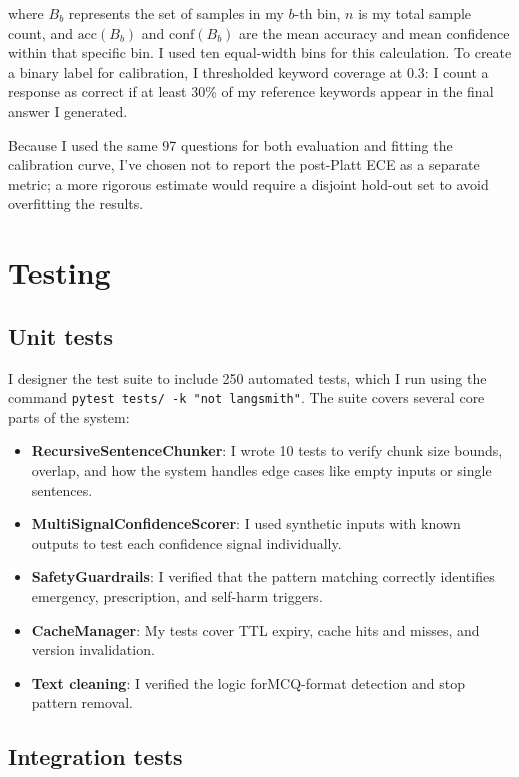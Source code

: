 where $B_b$ represents the set of samples in my $b$-th bin, $n$ is my total sample count, and $\text{acc}(B_b)$ and $\text{conf}(B_b)$ are the mean accuracy and mean confidence within that specific bin. I used ten equal-width bins for this calculation. To create a binary label for calibration, I thresholded keyword coverage at 0.3: I count a response as correct if at least 30\% of my reference keywords appear in the final answer I generated.

Because I used the same 97 questions for both evaluation and fitting the calibration curve, I've chosen not to report the post-Platt ECE as a separate metric; a more rigorous estimate would require a disjoint hold-out set to avoid overfitting the results.

\section{Testing}

\subsection{Unit tests}

I designer the test suite to include 250 automated tests, which I run using the command \texttt{pytest tests/\allowbreak{} -k "not langsmith"}. The suite covers several core parts of the system:

\begin{itemize}
    \item \textbf{RecursiveSentenceChunker}: I wrote 10 tests to verify chunk size bounds, overlap, and how the system handles edge cases like empty inputs or single sentences.
    \item \textbf{MultiSignalConfidenceScorer}: I used synthetic inputs with known outputs to test each confidence signal individually.
    \item \textbf{SafetyGuardrails}: I verified that the pattern matching correctly identifies emergency, prescription, and self-harm triggers.
    \item \textbf{CacheManager}: My tests cover TTL expiry, cache hits and misses, and version invalidation.
    \item \textbf{Text cleaning}: I verified the logic forMCQ-format detection and stop pattern removal.
\end{itemize}

\subsection{Integration tests}

